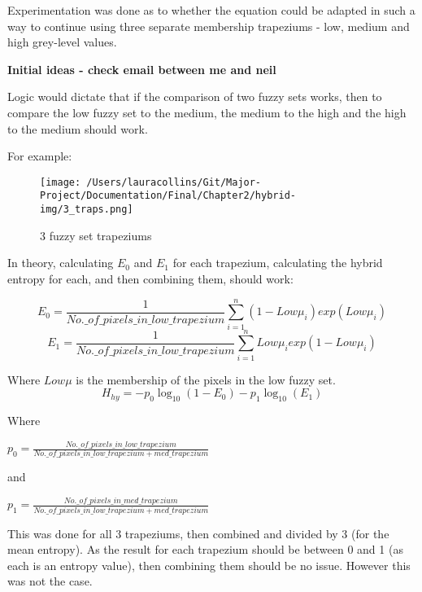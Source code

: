 Experimentation was done as to whether the equation could be adapted in such a way to continue using three separate membership trapeziums - low, medium and high grey-level values.

\textbf{Initial ideas - check email between me and neil}


Logic would dictate that if the comparison of two fuzzy sets works, then to compare the low fuzzy set to the medium, the medium to the high and the high to the medium should work.

For example:

\begin{figure}[!ht]
  \centering
  \texttt{[image: /Users/lauracollins/Git/Major-Project/Documentation/Final/Chapter2/hybrid-img/3\_traps.png]}
  \caption{3 fuzzy set trapeziums}
  \label{fig:3-traps}
\end{figure}

In theory, calculating $E_0$ and $E_1$ for each trapezium, calculating the hybrid entropy for each, and then combining them, should work:

\begin{equation}
E_0 = \frac{1}{No.\_of\_pixels\_in\_low\_trapezium}\displaystyle\sum_{i=1}^{n}{(1-Low\mu_i)exp(Low\mu_i)}
\end{equation}
\begin{equation}
E_1 = \frac{1}{No.\_of\_pixels\_in\_low\_trapezium}\displaystyle\sum_{i=1}^{n}{Low\mu_iexp(1-Low\mu_i)}
\end{equation}

Where $Low\mu$ is the membership of the pixels in the low fuzzy set.
\begin{equation}
H_{hy} = -p_0\log_{10}(1 - E_0) - p_1\log_{10}(E_1)
\end{equation}

Where

$p_0 = \frac{No.\_of\_pixels\_in\_low\_trapezium}{No.\_of\_pixels\_in\_low\_trapezium + med\_trapezium}$

and

$p_1 = \frac{No.\_of\_pixels\_in\_med\_trapezium}{No.\_of\_pixels\_in\_low\_trapezium + med\_trapezium}$


This was done for all 3 trapeziums, then combined and divided by 3 (for the mean entropy). As the result for each trapezium should be between 0 and 1 (as each is an entropy value), then combining them should be no issue. However this was not the case.

